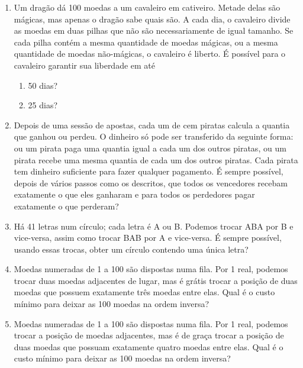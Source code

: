 \documentclass{article}
\begin{document}
\begin{enumerate}
    \item Um dragão dá 100 moedas a um cavaleiro em cativeiro.
    Metade delas são mágicas,
    mas apenas o dragão sabe quais são.
    A cada dia, o cavaleiro divide as moedas em duas pilhas que não são necessariamente de igual tamanho.
    Se cada pilha contém a mesma quantidade de moedas mágicas,
    ou a mesma quantidade de moedas não-mágicas,
    o cavaleiro é liberto.
    É possível para o cavaleiro garantir sua liberdade em até
    
    \begin{enumerate}
    \item 50 dias?
    
    \item 25 dias?
    \end{enumerate}
    
    \item Depois de uma sessão de apostas,
    cada um de cem piratas calcula a quantia que ganhou ou perdeu.
    O dinheiro só pode ser transferido da seguinte forma:
    ou um pirata paga uma quantia igual a cada um dos outros piratas,
    ou um pirata recebe uma mesma quantia de cada um dos outros piratas.
    Cada pirata tem dinheiro suficiente para fazer qualquer pagamento.
    É sempre possível, depois de vários passos como os descritos,
    que todos os vencedores recebam exatamente o que eles ganharam
    e para todos os perdedores pagar exatamente o que perderam?
    
    \item Há 41 letras num círculo;
    cada letra é A ou B.
    Podemos trocar ABA por B e vice-versa,
    assim como trocar BAB por A e vice-versa.
    É sempre possível, usando essas trocas,
    obter um círculo contendo uma única letra?
    
    \item Moedas numeradas de 1 a 100 são dispostas numa fila.
    Por 1 real, podemos trocar duas moedas adjacentes de lugar,
    mas é grátis trocar a posição de duas moedas que possuem exatamente três moedas entre elas.
    Qual é o custo mínimo para deixar as 100 moedas na ordem inversa?
    
    \item Moedas numeradas de 1 a 100 são dispostas numa fila.
    Por 1 real, podemos trocar a posição de moedas adjacentes,
    mas é de graça trocar a posição de duas moedas que possuam exatamente quatro moedas entre elas.
    Qual é o custo mínimo para deixar as 100 moedas na ordem inversa?
\end{enumerate}
\end{document}
